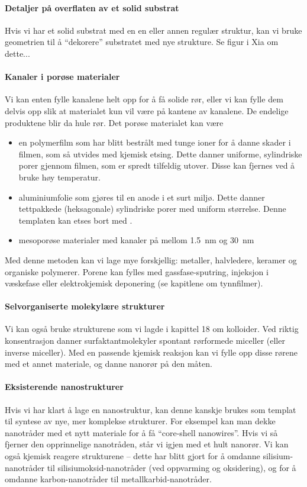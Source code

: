 \paragraph{Detaljer på overflaten av et solid substrat} Hvis vi har et solid substrat med en en eller annen regulær struktur, kan vi bruke geometrien til å ``dekorere'' substratet med nye strukture. Se figur i Xia om dette...

\paragraph{Kanaler i porøse materialer} Vi kan enten fylle kanalene helt opp for å få solide rør, eller vi kan fylle dem delvis opp slik at materialet kun vil være på kantene av kanalene. De endelige produktene blir da hule rør. Det porøse materialet kan være
\begin{itemize}
	\item en polymerfilm som har blitt bestrålt med tunge ioner for å danne skader i filmen, som så utvides med kjemisk etsing. Dette danner uniforme, sylindriske porer gjennom filmen, som er spredt tilfeldig utover. Disse kan fjernes ved å bruke høy temperatur.
	\item aluminiumfolie som gjøres til en anode i et surt miljø. Dette danner tettpakkede (heksagonale) sylindriske porer med uniform størrelse. Denne templaten kan etses bort med .
	\item mesoporøse materialer med kanaler på mellom \SI{1.5}{\nano\meter} og \SI{30}{\nano\meter}
\end{itemize}
Med denne metoden kan vi lage mye forskjellig: metaller, halvledere, keramer og organiske polymerer. Porene kan fylles med gassfase-sputring, injeksjon i væskefase eller elektrokjemisk deponering (se kapitlene om tynnfilmer).

\paragraph{Selvorganiserte molekylære strukturer} Vi kan også bruke strukturene som vi lagde i kapittel 18 om kolloider. Ved riktig konsentrasjon danner surfaktantmolekyler spontant rørformede miceller (eller inverse miceller). Med en passende kjemisk reaksjon kan vi fylle opp disse rørene med et annet materiale, og danne nanorør på den måten.

\paragraph{Eksisterende nanostrukturer} Hvis vi har klart å lage en nanostruktur, kan denne kanskje brukes som templat til syntese av nye, mer komplekse strukturer. For eksempel kan man dekke nanotråder med et nytt materiale for å få ``core-shell nanowires''. Hvis vi så fjerner den opprinnelige nanotråden, står vi igjen med et hult nanorør. Vi kan også kjemisk reagere strukturene -- dette har blitt gjort for å omdanne silisium-nanotråder til silisiumoksid-nanotråder (ved oppvarming og oksidering), og for å omdanne karbon-nanotråder til metallkarbid-nanotråder.

